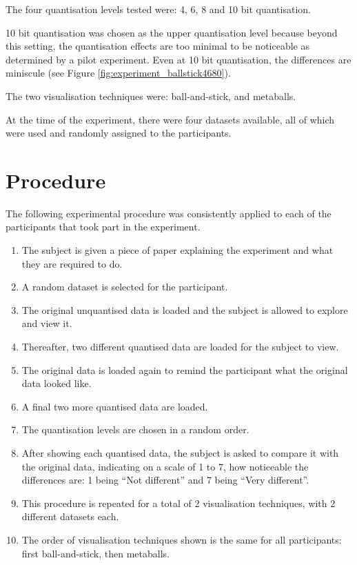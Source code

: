 The four quantisation levels tested were: 4, 6, 8 and 10 bit quantisation.

10 bit quantisation was chosen as the upper quantisation level because beyond
this setting, the quantisation effects are too minimal to be noticeable as
determined by a pilot experiment. Even at 10 bit quantisation, the differences
are miniscule (see Figure \ref{fig:experiment_ballstick4680}).

The two visualisation techniques were: ball-and-stick, and metaballs.

At the time of the experiment, there were four datasets available, all of which
were used and randomly assigned to the participants.


\section{Procedure}
\label{sec:experiment_procedure}

The following experimental procedure was consistently applied to each of the
participants that took part in the experiment.

\begin{enumerate}

  \item The subject is given a piece of paper explaining the experiment and
  what they are required to do.

  \item A random dataset is selected for the participant.

  \item The original unquantised data is loaded and the subject is allowed to
  explore and view it.

  \item Thereafter, two different quantised data are loaded for the subject to
  view.

  \item The original data is loaded again to remind the participant what the
  original data looked like.

  \item A final two more quantised data are loaded.

  \item The quantisation levels are chosen in a random order.

  \item After showing each quantised data, the subject is asked to compare it
  with the original data, indicating on a scale of 1 to 7, how noticeable the
  differences are: 1 being ``Not different'' and 7 being ``Very different''.

  \item This procedure is repeated for a total of 2 visualisation techniques,
  with 2 different datasets each.

  \item The order of visualisation techniques shown is the same for all
  participants: first ball-and-stick, then metaballs.

\end{enumerate}

